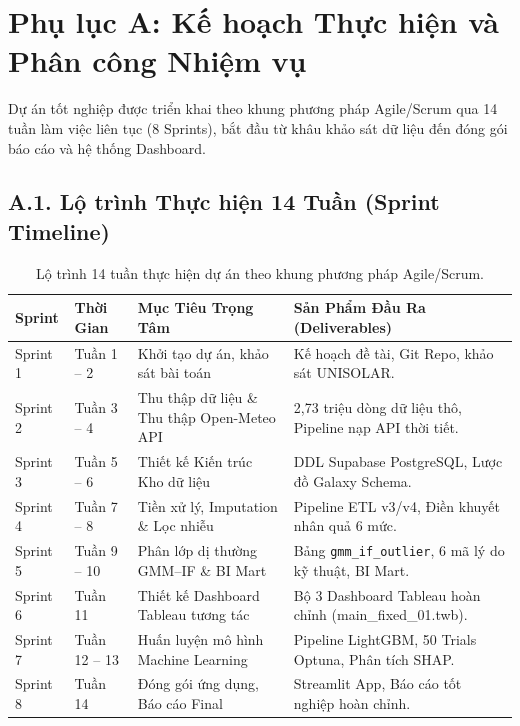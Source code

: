 \documentclass[12pt, a4paper]{report}
\begin{document}
\chapter*{Phụ lục A: Kế hoạch Thực hiện và Phân công Nhiệm vụ}
\label{app:kehoach}

Dự án tốt nghiệp được triển khai theo khung phương pháp Agile/Scrum qua 14 tuần làm việc liên tục (8 Sprints), bắt đầu từ khâu khảo sát dữ liệu đến đóng gói báo cáo và hệ thống Dashboard.

\section*{A.1. Lộ trình Thực hiện 14 Tuần (Sprint Timeline)}

\begin{table}[H]
\centering
\small
\renewcommand{\arraystretch}{1.2}
\begin{tabularx}{\textwidth}{@{} l l p{5cm} X @{}}
\toprule
\textbf{Sprint} & \textbf{Thời Gian} & \textbf{Mục Tiêu Trọng Tâm} & \textbf{Sản Phẩm Đầu Ra (Deliverables)} \\
\midrule
Sprint 1 & Tuần 1 -- 2 & Khởi tạo dự án, khảo sát bài toán & Kế hoạch đề tài, Git Repo, khảo sát UNISOLAR. \\
Sprint 2 & Tuần 3 -- 4 & Thu thập dữ liệu \& Thu thập Open-Meteo API & 2,73 triệu dòng dữ liệu thô, Pipeline nạp API thời tiết. \\
Sprint 3 & Tuần 5 -- 6 & Thiết kế Kiến trúc Kho dữ liệu & DDL Supabase PostgreSQL, Lược đồ Galaxy Schema. \\
Sprint 4 & Tuần 7 -- 8 & Tiền xử lý, Imputation \& Lọc nhiễu & Pipeline ETL v3/v4, Điền khuyết nhân quả 6 mức. \\
Sprint 5 & Tuần 9 -- 10 & Phân lớp dị thường GMM--IF \& BI Mart & Bảng \texttt{gmm\_if\_outlier}, 6 mã lý do kỹ thuật, BI Mart. \\
Sprint 6 & Tuần 11 & Thiết kế Dashboard Tableau tương tác & Bộ 3 Dashboard Tableau hoàn chỉnh (main\_fixed\_01.twb). \\
Sprint 7 & Tuần 12 -- 13 & Huấn luyện mô hình Machine Learning & Pipeline LightGBM, 50 Trials Optuna, Phân tích SHAP. \\
Sprint 8 & Tuần 14 & Đóng gói ứng dụng, Báo cáo Final & Streamlit App, Báo cáo tốt nghiệp hoàn chỉnh. \\
\bottomrule
\end{tabularx}
\caption{Lộ trình 14 tuần thực hiện dự án theo khung phương pháp Agile/Scrum.}
\label{tab:sprint_timeline}
\end{table}
\end{document}
